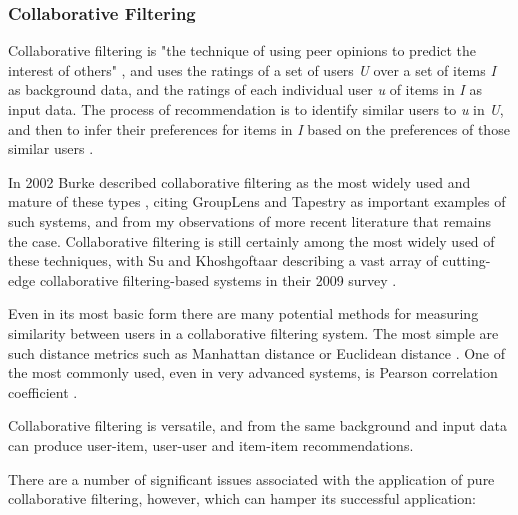 \subsubsection{Collaborative Filtering}

Collaborative filtering is "the technique of using peer opinions to predict the interest of others" \cite{Claypool99}, and uses the ratings of a set of users \textit{U} over a set of items \textit{I} as background data, and the ratings of each individual user \textit{u} of items in \textit{I} as input data. The process of recommendation is to identify similar users to \textit{u} in \textit{U}, and then to infer their preferences for items in \textit{I} based on the preferences of those similar users \cite{Burke02}.

In 2002 Burke described collaborative filtering as the most widely used and mature of these types \cite{Burke02}, citing GroupLens \cite{Resnick94} and Tapestry \cite{Goldberg92} as important examples of such systems, and from my observations of more recent literature that remains the case. Collaborative filtering is still certainly among the most widely used of these techniques, with Su and Khoshgoftaar describing a vast array of cutting-edge collaborative filtering-based systems in their 2009 survey \cite{Su09}.

Even in its most basic form there are many potential methods for measuring similarity between users in a collaborative filtering system. The most simple are such distance metrics such as Manhattan distance or Euclidean distance \cite{Segaran07}. One of the most commonly used, even in very advanced systems, is Pearson correlation coefficient \cite{Segaran07}.

Collaborative filtering is versatile, and from the same background and input data can produce user-item, user-user and item-item recommendations.

There are a number of significant issues associated with the application of pure collaborative filtering, however, which can hamper its successful application:

